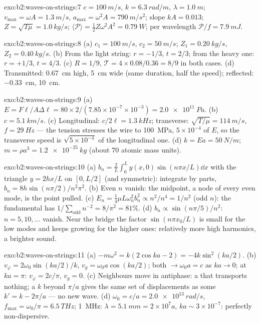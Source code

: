 \begin{solution}{exo:b2:waves-on-strings:7}
$c = \qty{100}{m/s}$, $k = \qty{6.3}{rad/m}$, $\lambda = \qty{1.0}{m}$; $v_{\max} = \omega A =
\qty{1.3}{m/s}$, $a_{\max} = \omega^2A = \qty{790}{m/s^2}$; slope $kA = 0.013$; $Z =
\sqrt{T\mu} = \qty{1.0}{kg/s}$; $\langle\mathcal P\rangle = \tfrac12Z\omega^2A^2 = \qty{0.79}{W}$;
per wavelength $\mathcal P/f = \qty{7.9}{mJ}$.
\end{solution}

\begin{solution}{exo:b2:waves-on-strings:8}
(a) $c_1 = \qty{100}{m/s}$, $c_2 = \qty{50}{m/s}$; $Z_1 = \qty{0.20}{kg/s}$, $Z_2 = \qty{0.40}{kg/s}$.
(b) From the light string: $r = -1/3$, $t = 2/3$; from the heavy one: $r =
+1/3$, $t = 4/3$. (c) $R = 1/9$, $\mathcal T = 4 \times 0.08/0.36 = 8/9$ in both cases.
(d) Transmitted: \qty{0.67}{cm} high, \qty{5}{cm} wide (same duration, half
the speed); reflected: \qty{-0.33}{cm}, \qty{10}{cm}.
\end{solution}

\begin{solution}{exo:b2:waves-on-strings:9}
(a) $E = F\ell/A\Delta\ell = 80 \times 2/(7.85 \times 10^{-7} \times 10^{-3}) = \qty{2.0e11}{Pa}$.
(b) $c = \qty{5.1}{km/s}$. (c) Longitudinal: $c/2\ell = \qty{1.3}{kHz}$; transverse:
$\sqrt{T/\mu} = \qty{114}{m/s}$, $f = \qty{29}{Hz}$ --- the tension stresses the
wire to \qty{100}{MPa}, $5 \times 10^{-4}$ of $E$, so the transverse speed is
$\sqrt{5 \times 10^{-4}}$ of the longitudinal one. (d) $k = Ea = \qty{50}{N/m}$; $m
= \rho a^3 = \qty{1.2e-25}{kg}$ (about $70$ atomic mass units).
\end{solution}

\begin{solution}{exo:b2:waves-on-strings:10}
(a) $b_n = \frac2L\int_0^Ly(x, 0)\sin(n\pi x/L)\dd x$ with the triangle $y =
2hx/L$ on $[0, L/2]$ (and symmetric): integrate by parts, $b_n = 8h\sin(n\pi/2)
/n^2\pi^2$. (b) Even $n$ vanish: the midpoint, a node of every even mode,
is the point pulled. (c) $E_n = \tfrac14\mu L\omega_n^2b_n^2 \propto n^2/n^4 = 1/n^2$
(odd $n$): the fundamental has $1/\sum_{\text{odd}}n^{-2} = 8/\pi^2 = 81\%$. (d)
$b_n \propto \sin(n\pi/5)/n^2$: $n = 5, 10, \dots$ vanish. Near the bridge the
factor $\sin(n\pi x_0/L)$ is small for the low modes and keeps growing
for the higher ones: relatively more high harmonics, a brighter sound.
\end{solution}

\begin{solution}{exo:b2:waves-on-strings:11}
(a) $-m\omega^2 = k(2\cos ka - 2) = -4k\sin^2(ka/2)$. (b) $v_\varphi = 2\omega_0\sin(ka/2)
/k$, $v_g = \omega_0a\cos(ka/2)$; both $\to \omega_0a = c$ as $ka \to 0$; at $ka = \pi$:
$v_\varphi = 2c/\pi$, $v_g = 0$. (c) Neighbours move in antiphase: a  that transports nothing; a $k$ beyond $\pi/a$ gives the same set of
displacements as some $k' = k - 2\pi/a$ --- no new wave. (d) $\omega_0 = c/a =
\qty{2.0e13}{rad/s}$, $f_{\max} = \omega_0/\pi = \qty{6.5}{THz}$; \qty{1}{MHz}: $\lambda =
\qty{5.1}{mm} = 2 \times 10^7a$, $ka \sim 3 \times 10^{-7}$: perfectly non-dispersive.
\end{solution}

